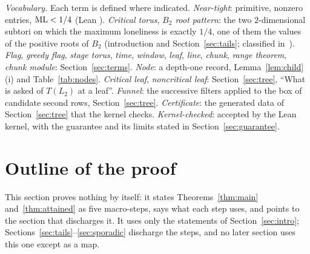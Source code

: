 \documentclass[11pt]{article}
\theoremstyle{remark}
\newcommand{\lean}[1]{{\small\texttt{\detokenize{#1}}}}
\begin{document}
\emph{Vocabulary.} Each term is defined where indicated. \emph{Near-tight}: primitive, nonzero entries, $\mathrm{ML}<1/4$ (Lean \lean{NearTight}). \emph{Critical torus}, \emph{$B_2$ root pattern}: the two $2$-dimensional subtori on which the maximum loneliness is exactly $1/4$, one of them the values of the positive roots of $B_2$ (introduction and Section~\ref{sec:tails}; classified in~\cite{JK}). \emph{Flag}, \emph{greedy flag}, \emph{stage torus}, \emph{time}, \emph{window}, \emph{leaf}, \emph{line}, \emph{chunk}, \emph{range theorem}, \emph{chunk module}: Section~\ref{sec:terms}. \emph{Node}: a depth-one record, Lemma~\ref{lem:child}(i) and Table~\ref{tab:nodes}. \emph{Critical leaf}, \emph{noncritical leaf}: Section~\ref{sec:tree}, ``What is asked of $T(L_2)$ at a leaf''. \emph{Funnel}: the successive filters applied to the box of candidate second rows, Section~\ref{sec:tree}. \emph{Certificate}: the generated data of Section~\ref{sec:tree} that the kernel checks. \emph{Kernel-checked}: accepted by the Lean kernel, with the guarantee and its limits stated in Section~\ref{sec:guarantee}.

\section{Outline of the proof}\label{sec:outline}

This section proves nothing by itself: it states Theorems~\ref{thm:main} and~\ref{thm:attained} as five macro-steps, says what each step uses, and points to the section that discharges it. It uses only the statements of Section~\ref{sec:intro}; Sections~\ref{sec:tails}--\ref{sec:sporadic} discharge the steps, and no later section uses this one except as a map.
\end{document}
